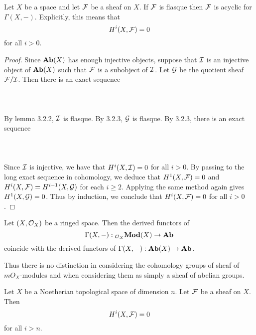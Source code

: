 \documentclass[a4paper]{article}
\begin{document}
\begin{prp}{}{} Let $X$ be a space and let $\mathcal{F}$ be a sheaf on $X$. If $\mathcal{F}$ is flasque then $\mathcal{F}$ is acyclic for $\Gamma(X,-)$. Explicitly, this means that $$H^i(X,\mathcal{F})=0$$ for all $i>0$. \tcbline
\begin{proof}
Since $\bold{Ab}(X)$ has enough injective objects, suppose that $\mathcal{I}$ is an injective object of $\bold{Ab}(X)$ such that $\mathcal{F}$ is a subobject of $\mathcal{I}$. Let $\mathcal{G}$ be the quotient sheaf $\mathcal{F}/\mathcal{I}$. Then there is an exact sequence \\~\\
\\~\\
By lemma 3.2.2, $\mathcal{I}$ is flasque. By 3.2.3, $\mathcal{G}$ is flasque. By 3.2.3, there is an exact sequence \\~\\
\\~\\
Since $\mathcal{I}$ is injective, we have that $H^i(X,\mathcal{I})=0$ for all $i>0$. By passing to the long exact sequence in cohomology, we deduce that $H^1(X,\mathcal{F})=0$ and $H^i(X,\mathcal{F})=H^{i-1}(X,\mathcal{G})$ for each $i\geq 2$. Applying the same method again gives $H^1(X,\mathcal{G})=0$. Thus by induction, we conclude that $H^i(X,\mathcal{F})=0$ for all $i>0$. 
\end{proof}
\end{prp}

\begin{prp}{}{} Let $(X,\mathcal{O}_X)$ be a ringed space. Then the derived functors of $$\Gamma(X,-):{_{\mathcal{O}_X}\bold{Mod}}(X)\to\bold{Ab}$$ coincide with the derived functors of $\Gamma(X,-):\bold{Ab}(X)\to\bold{Ab}$. 
\end{prp}

Thus there is no distinction in considering the cohomology groups of sheaf of $mO_X$-modules and when considering them as simply a sheaf of abelian groups. 

\begin{thm}{}{} Let $X$ be a Noetherian topological space of dimension $n$. Let $\mathcal{F}$ be a sheaf on $X$. Then $$H^i(X,\mathcal{F})=0$$ for all $i>n$. 
\end{thm}
\end{document}
